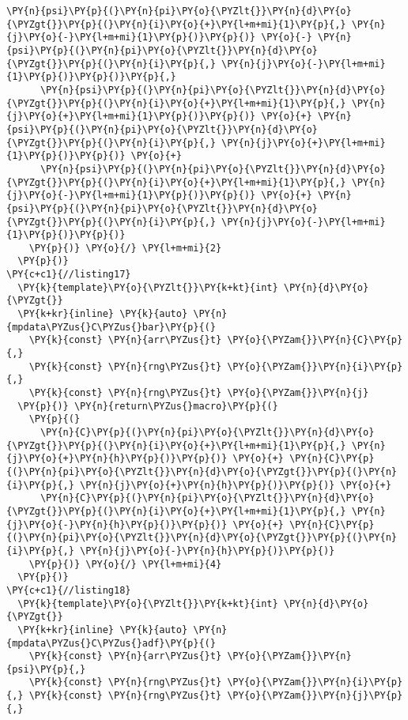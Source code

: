\begin{Verbatim}[commandchars=\\\{\}]
      \PY{n}{psi}\PY{p}{(}\PY{n}{pi}\PY{o}{\PYZlt{}}\PY{n}{d}\PY{o}{\PYZgt{}}\PY{p}{(}\PY{n}{i}\PY{o}{+}\PY{l+m+mi}{1}\PY{p}{,} \PY{n}{j}\PY{o}{-}\PY{l+m+mi}{1}\PY{p}{)}\PY{p}{)} \PY{o}{-} \PY{n}{psi}\PY{p}{(}\PY{n}{pi}\PY{o}{\PYZlt{}}\PY{n}{d}\PY{o}{\PYZgt{}}\PY{p}{(}\PY{n}{i}\PY{p}{,} \PY{n}{j}\PY{o}{-}\PY{l+m+mi}{1}\PY{p}{)}\PY{p}{)}\PY{p}{,}
      \PY{n}{psi}\PY{p}{(}\PY{n}{pi}\PY{o}{\PYZlt{}}\PY{n}{d}\PY{o}{\PYZgt{}}\PY{p}{(}\PY{n}{i}\PY{o}{+}\PY{l+m+mi}{1}\PY{p}{,} \PY{n}{j}\PY{o}{+}\PY{l+m+mi}{1}\PY{p}{)}\PY{p}{)} \PY{o}{+} \PY{n}{psi}\PY{p}{(}\PY{n}{pi}\PY{o}{\PYZlt{}}\PY{n}{d}\PY{o}{\PYZgt{}}\PY{p}{(}\PY{n}{i}\PY{p}{,} \PY{n}{j}\PY{o}{+}\PY{l+m+mi}{1}\PY{p}{)}\PY{p}{)} \PY{o}{+}
      \PY{n}{psi}\PY{p}{(}\PY{n}{pi}\PY{o}{\PYZlt{}}\PY{n}{d}\PY{o}{\PYZgt{}}\PY{p}{(}\PY{n}{i}\PY{o}{+}\PY{l+m+mi}{1}\PY{p}{,} \PY{n}{j}\PY{o}{-}\PY{l+m+mi}{1}\PY{p}{)}\PY{p}{)} \PY{o}{+} \PY{n}{psi}\PY{p}{(}\PY{n}{pi}\PY{o}{\PYZlt{}}\PY{n}{d}\PY{o}{\PYZgt{}}\PY{p}{(}\PY{n}{i}\PY{p}{,} \PY{n}{j}\PY{o}{-}\PY{l+m+mi}{1}\PY{p}{)}\PY{p}{)}
    \PY{p}{)} \PY{o}{/} \PY{l+m+mi}{2}
  \PY{p}{)}
\PY{c+c1}{//listing17}
  \PY{k}{template}\PY{o}{\PYZlt{}}\PY{k+kt}{int} \PY{n}{d}\PY{o}{\PYZgt{}}
  \PY{k+kr}{inline} \PY{k}{auto} \PY{n}{mpdata\PYZus{}C\PYZus{}bar}\PY{p}{(}
    \PY{k}{const} \PY{n}{arr\PYZus{}t} \PY{o}{\PYZam{}}\PY{n}{C}\PY{p}{,} 
    \PY{k}{const} \PY{n}{rng\PYZus{}t} \PY{o}{\PYZam{}}\PY{n}{i}\PY{p}{,} 
    \PY{k}{const} \PY{n}{rng\PYZus{}t} \PY{o}{\PYZam{}}\PY{n}{j}
  \PY{p}{)} \PY{n}{return\PYZus{}macro}\PY{p}{(}
    \PY{p}{(}
      \PY{n}{C}\PY{p}{(}\PY{n}{pi}\PY{o}{\PYZlt{}}\PY{n}{d}\PY{o}{\PYZgt{}}\PY{p}{(}\PY{n}{i}\PY{o}{+}\PY{l+m+mi}{1}\PY{p}{,} \PY{n}{j}\PY{o}{+}\PY{n}{h}\PY{p}{)}\PY{p}{)} \PY{o}{+} \PY{n}{C}\PY{p}{(}\PY{n}{pi}\PY{o}{\PYZlt{}}\PY{n}{d}\PY{o}{\PYZgt{}}\PY{p}{(}\PY{n}{i}\PY{p}{,} \PY{n}{j}\PY{o}{+}\PY{n}{h}\PY{p}{)}\PY{p}{)} \PY{o}{+}
      \PY{n}{C}\PY{p}{(}\PY{n}{pi}\PY{o}{\PYZlt{}}\PY{n}{d}\PY{o}{\PYZgt{}}\PY{p}{(}\PY{n}{i}\PY{o}{+}\PY{l+m+mi}{1}\PY{p}{,} \PY{n}{j}\PY{o}{-}\PY{n}{h}\PY{p}{)}\PY{p}{)} \PY{o}{+} \PY{n}{C}\PY{p}{(}\PY{n}{pi}\PY{o}{\PYZlt{}}\PY{n}{d}\PY{o}{\PYZgt{}}\PY{p}{(}\PY{n}{i}\PY{p}{,} \PY{n}{j}\PY{o}{-}\PY{n}{h}\PY{p}{)}\PY{p}{)} 
    \PY{p}{)} \PY{o}{/} \PY{l+m+mi}{4}
  \PY{p}{)}
\PY{c+c1}{//listing18}
  \PY{k}{template}\PY{o}{\PYZlt{}}\PY{k+kt}{int} \PY{n}{d}\PY{o}{\PYZgt{}}
  \PY{k+kr}{inline} \PY{k}{auto} \PY{n}{mpdata\PYZus{}C\PYZus{}adf}\PY{p}{(}
    \PY{k}{const} \PY{n}{arr\PYZus{}t} \PY{o}{\PYZam{}}\PY{n}{psi}\PY{p}{,} 
    \PY{k}{const} \PY{n}{rng\PYZus{}t} \PY{o}{\PYZam{}}\PY{n}{i}\PY{p}{,} \PY{k}{const} \PY{n}{rng\PYZus{}t} \PY{o}{\PYZam{}}\PY{n}{j}\PY{p}{,}

\end{Verbatim}
